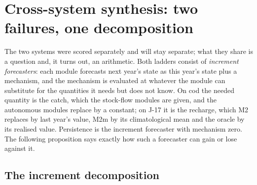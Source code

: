\FloatBarrier
\section{Cross-system synthesis: two failures, one decomposition}\label{sec:synthesis}

The two systems were scored separately and will stay separate; what they share is a question and, it turns out, an arithmetic. Both ladders consist of \emph{increment forecasters}: each module forecasts next year's state as this year's state plus a mechanism, and the mechanism is evaluated at whatever the module can substitute for the quantities it needs but does not know. On cod the needed quantity is the catch, which the stock-flow modules are given, and the autonomous modules replace by a constant; on J-17 it is the recharge, which M2 replaces by last year's value, M2m by its climatological mean and the oracle by its realised value. Persistence is the increment forecaster with mechanism zero. The following proposition says exactly how such a forecaster can gain or lose against it.

\subsection{The increment decomposition}\label{sec:decomp}

